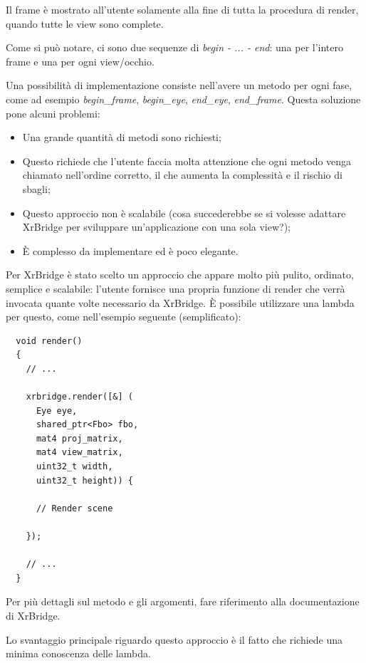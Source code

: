 \documentclass[twoside]{supsistudent}
\begin{document}
Il frame è mostrato all'utente solamente alla fine di tutta la procedura di render, quando tutte le view sono complete.

Come si può notare, ci sono due sequenze di \textit{begin - ... - end}: una per l'intero frame e una per ogni view/occhio.

Una possibilità di implementazione consiste nell'avere un metodo per ogni fase, come ad esempio \textit{begin\_frame}, \textit{begin\_eye}, \textit{end\_eye}, \textit{end\_frame}. Questa soluzione pone alcuni problemi:

\begin{itemize}
  \item Una grande quantità di metodi sono richiesti;
  \item Questo richiede che l'utente faccia molta attenzione che ogni metodo venga chiamato nell'ordine corretto, il che aumenta la complessità e il rischio di sbagli;
  \item Questo approccio non è scalabile (cosa succederebbe se si volesse adattare XrBridge per sviluppare un'applicazione con una sola view?);
  \item È complesso da implementare ed è poco elegante.
\end{itemize}

Per XrBridge è stato scelto un approccio che appare molto più pulito, ordinato, semplice e scalabile: l'utente fornisce una propria funzione di render che verrà invocata quante volte necessario da XrBridge. È possibile utilizzare una lambda per questo, come nell'esempio seguente (semplificato):

\begin{verbatim}
  void render()
  {
    // ...

    xrbridge.render([&] (
      Eye eye,
      shared_ptr<Fbo> fbo,
      mat4 proj_matrix,
      mat4 view_matrix,
      uint32_t width,
      uint32_t height)) {

      // Render scene

    });

    // ...
  }
\end{verbatim}

Per più dettagli sul metodo e gli argomenti, fare riferimento alla documentazione di XrBridge.

Lo svantaggio principale riguardo questo approccio è il fatto che richiede una minima conoscenza delle lambda.
\end{document}
